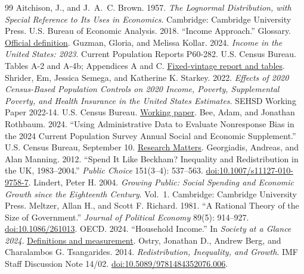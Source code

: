 \documentclass[11pt,a4paper]{article}
\begin{document}
\begin{thebibliography}{99}
\small
{} Aitchison, J., and J.~A.~C. Brown. 1957. \emph{The Lognormal Distribution, with Special Reference to Its Uses in Economics}. Cambridge: Cambridge University Press.
 U.S. Bureau of Economic Analysis. 2018. ``Income Approach.'' Glossary. \href{https://www.bea.gov/help/glossary/income-approach}{Official definition}.
 Guzman, Gloria, and Melissa Kollar. 2024. \emph{Income in the United States: 2023}. Current Population Reports P60-282. U.S. Census Bureau. Tables A-2 and A-4b; Appendices A and C. \href{https://www2.census.gov/library/publications/2024/demo/p60-282.pdf}{Fixed-vintage report and tables}.
 Shrider, Em, Jessica Semega, and Katherine K. Starkey. 2022. \emph{Effects of 2020 Census-Based Population Controls on 2020 Income, Poverty, Supplemental Poverty, and Health Insurance in the United States Estimates}. SEHSD Working Paper 2022-14. U.S. Census Bureau. \href{https://www.census.gov/content/dam/Census/library/working-papers/2022/demo/sehsd-wp2022-14.pdf}{Working paper}.
 Bee, Adam, and Jonathan Rothbaum. 2024. ``Using Administrative Data to Evaluate Nonresponse Bias in the 2024 Current Population Survey Annual Social and Economic Supplement.'' U.S. Census Bureau, September 10. \href{https://www.census.gov/newsroom/blogs/research-matters/2024/09/administrative-data-nonresponse-bias-cps-asec.html}{Research Matters}.
 Georgiadis, Andreas, and Alan Manning. 2012. ``Spend It Like Beckham? Inequality and Redistribution in the UK, 1983--2004.'' \emph{Public Choice} 151(3--4): 537--563. \href{https://doi.org/10.1007/s11127-010-9758-7}{doi:10.1007/s11127-010-9758-7}.
 Lindert, Peter H. 2004. \emph{Growing Public: Social Spending and Economic Growth since the Eighteenth Century}. Vol.~1. Cambridge: Cambridge University Press.
 Meltzer, Allan H., and Scott F. Richard. 1981. ``A Rational Theory of the Size of Government.'' \emph{Journal of Political Economy} 89(5): 914--927. \href{https://doi.org/10.1086/261013}{doi:10.1086/261013}.
 OECD. 2024. ``Household Income.'' In \emph{Society at a Glance 2024}. \href{https://www.oecd.org/en/publications/society-at-a-glance-2024_918d8db3-en/full-report/household-income_3ee61044.html}{Definitions and measurement}.
 Ostry, Jonathan D., Andrew Berg, and Charalambos G. Tsangarides. 2014. \emph{Redistribution, Inequality, and Growth}. IMF Staff Discussion Note 14/02. \href{https://doi.org/10.5089/9781484352076.006}{doi:10.5089/9781484352076.006}.
\end{thebibliography}
\end{document}
